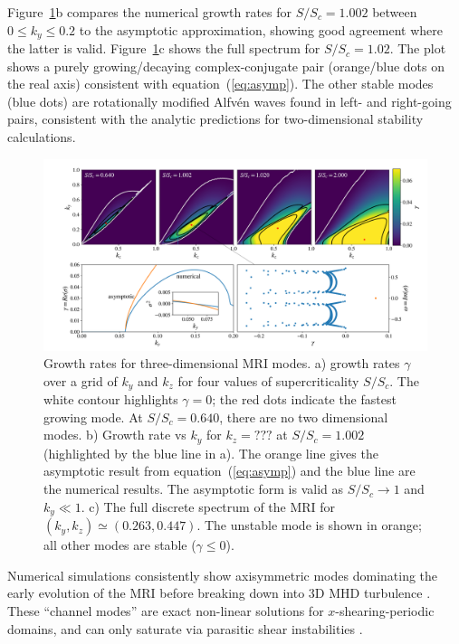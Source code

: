 \documentclass[aps,prl,reprint,superscriptaddress]{revtex4-1}
\newcommand{\SSC}{S/S_{c}}
\begin{document}
Figure~\ref{fig:growth_rate}b compares the numerical growth rates for $\SSC=1.002$ between $0 \le k_y \le 0.2$ to the asymptotic approximation, showing good agreement where the latter is valid.
Figure~\ref{fig:growth_rate}c shows the full spectrum for $\SSC = 1.02$.
The plot shows a purely growing/decaying complex-conjugate pair (orange/blue dots on the real axis) consistent with equation~(\ref{eq:asymp}).
The other stable modes (blue dots) are rotationally modified Alfv\'{e}n waves found in left- and right-going pairs, consistent with the analytic predictions for two-dimensional stability calculations.
%
\begin{figure}[h!]
  \includegraphics[width=\textwidth]{fig_1.pdf}
  \caption{Growth rates for three-dimensional MRI modes. a) growth rates $\gamma$ over a grid of $k_y$ and $k_z$ for four values of supercriticality $\SSC$. The white contour highlights $\gamma = 0$; the red dots indicate the fastest growing mode. At $\SSC = 0.640$, there are no two dimensional modes. b) Growth rate vs $k_y$ for $k_z = ???$ at $\SSC = 1.002$ (highlighted by the blue line in a). The orange line gives the asymptotic result from equation~(\ref{eq:asymp}) and the blue line are the numerical results. The asymptotic form is valid as $\SSC \to 1$ and $k_y \ll 1$. c) The full discrete spectrum of the MRI for $(k_y, k_z) \simeq (0.263, 0.447)$. The unstable mode is shown in orange; all other modes are stable ($\gamma \le 0$).}
  \label{fig:growth_rate}
\end{figure}
%
Numerical simulations consistently show axisymmetric modes dominating the early evolution of the MRI before breaking down into 3D MHD turbulence \citep{1995ApJ...440..742H,2018ApJ...853..174H,2019ApJS..241...26D}. 
These ``channel modes'' are exact non-linear solutions for $x$-shearing-periodic domains, and can only saturate via parasitic shear instabilities \citep{1994ApJ...432..213G}.
\end{document}
